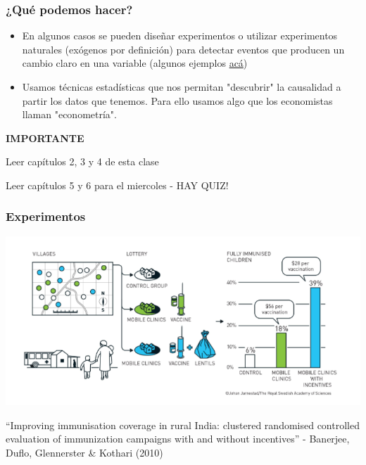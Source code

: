 \documentclass{beamer}
\begin{document}
\begin{frame} 
    \frametitle{¿Qué podemos hacer?}
    \begin{itemize}
        \item  En algunos casos se pueden diseñar experimentos o utilizar experimentos naturales (exógenos por definición) para detectar eventos que producen un cambio claro en una variable (algunos ejemplos \hyperlink{appendix}{acá})
        \item Usamos técnicas estadísticas que nos permitan "descubrir" la causalidad a partir los datos que tenemos. Para ello usamos algo que los economistas llaman "econometría". 
    \end{itemize}
\end{frame}

\begin{frame}
    \begin{center}
        \LARGE  \textbf{IMPORTANTE}  \\ \vspace{1cm}
        \Large 
        \begin{boxB}
        \centering Leer capítulos 2, 3 y 4 de esta clase
        \end{boxB}
        \vspace{0.5cm}
        \begin{boxB}
        Leer capítulos 5 y 6 para el miercoles - HAY QUIZ!
        \end{boxB}
    \end{center}
\end{frame}

\begin{frame} \label{appendix}
    \frametitle{Experimentos}
    \begin{center}
    \includegraphics[scale=0.1]{../Figures/Duflo.png}
    \end{center}
    “Improving immunisation coverage in rural India: clustered randomised controlled evaluation of immunization campaigns with and without incentives” - Banerjee, Duflo, Glennerster \& Kothari (2010) \\  \vspace{2mm}
\end{frame}
    
\end{document}
